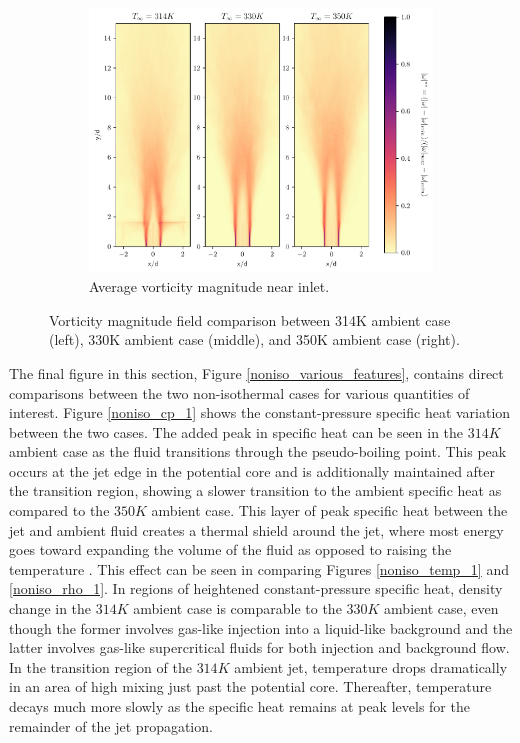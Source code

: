 \begin{figure}[H]
\begin{subfigure}{0.5\textwidth}
	\includegraphics[scale=.45]{figures/Plots/vertical/magvort_scaled_vert_avg_all_zoom.pdf}
	\caption{Average vorticity magnitude near inlet.} \label{all_magvort_3}
\end{subfigure}
\caption{Vorticity magnitude field comparison between 314K ambient case (left), 330K ambient case (middle), and 350K ambient case (right).}
\label{all_magvort_features}
\end{figure}

The final figure in this section, Figure \ref{noniso_various_features}, contains direct comparisons between the two non-isothermal cases for various quantities of interest. Figure \ref{noniso_cp_1} shows the constant-pressure specific heat variation between the two cases. The added peak in specific heat can be seen in the $314 K$ ambient case as the fluid transitions through the pseudo-boiling point. This peak occurs at the jet edge in the potential core and is additionally maintained after the transition region, showing a slower transition to the ambient specific heat as compared to the $350 K $ ambient case. This layer of peak specific heat between the jet and ambient fluid creates a thermal shield around the jet, where most energy goes toward expanding the volume of the fluid as opposed to raising the temperature \cite{10.1063/1.5054797}. This effect can be seen in comparing Figures \ref{noniso_temp_1} and \ref{noniso_rho_1}. In regions of heightened constant-pressure specific heat, density change in the $314 K$ ambient case is comparable to the $330 K$ ambient case, even though the former involves gas-like injection into a liquid-like background and the latter involves gas-like supercritical fluids for both injection and background flow. In the transition region of the $314K$ ambient jet, temperature drops dramatically in an area of high mixing just past the potential core. Thereafter, temperature decays much more slowly as the specific heat remains at peak levels for the remainder of the jet propagation. 

